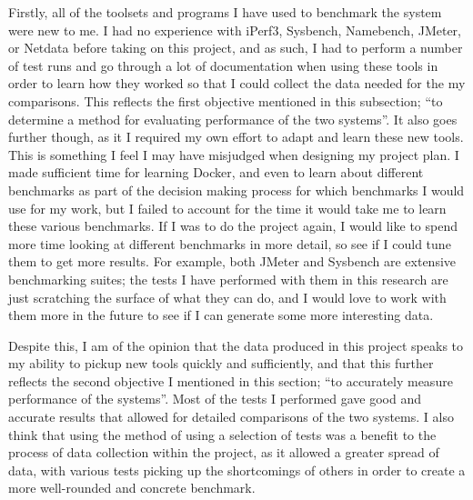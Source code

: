 Firstly, all of the toolsets and programs I have used to benchmark the system were new to me. I had no experience with iPerf3, Sysbench, Namebench, JMeter, or Netdata before taking on this project, and as such, I had to perform a number of test runs and go through a lot of documentation when using these tools in order to learn how they worked so that I could collect the data needed for the my comparisons. This reflects the first objective mentioned in this subsection; ``to determine a method for evaluating performance of the two systems''. It also goes further though, as it I required my own effort to adapt and learn these new tools. This is something I feel I may have misjudged when designing my project plan. I made sufficient time for learning Docker, and even to learn about different benchmarks as part of the decision making process for which benchmarks I would use for my work, but I failed to account for the time it would take me to learn these various benchmarks. If I was to do the project again, I would like to spend more time looking at different benchmarks in more detail, so see if I could tune them to get more results. For example, both JMeter and Sysbench are extensive benchmarking suites; the tests I have performed with them in this research are just scratching the surface of what they can do, and I would love to work with them more in the future to see if I can generate some more interesting data.


Despite this, I am of the opinion that the data produced in this project speaks to my ability to pickup new tools quickly and sufficiently, and that this further reflects the second objective I mentioned in this section; ``to accurately measure performance of the systems''. Most of the tests I performed gave good and accurate results that allowed for detailed comparisons of the two systems. I also think that using the method of using a selection of tests was a benefit to the process of data collection within the project, as it allowed a greater spread of data, with various tests picking up the shortcomings of others in order to create a more well-rounded and concrete benchmark.

